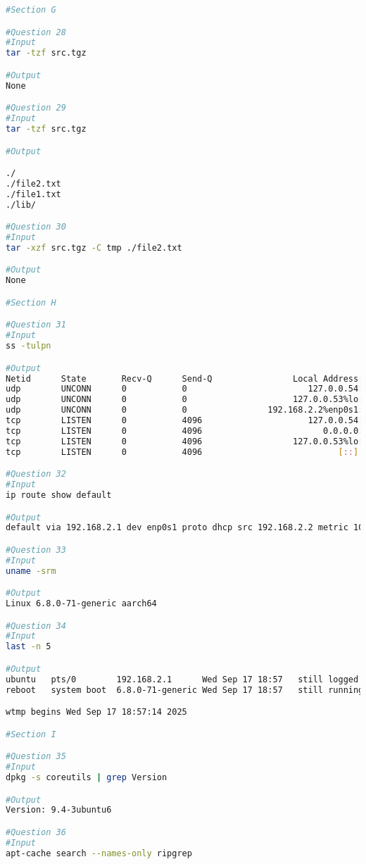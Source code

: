 \begin{lstlisting}[style=linuxstyle, language=bash]
#Section G

#Question 28
#Input
tar -tzf src.tgz

#Output
None

#Question 29
#Input 
tar -tzf src.tgz

#Output

./
./file2.txt
./file1.txt
./lib/

#Question 30
#Input
tar -xzf src.tgz -C tmp ./file2.txt

#Output
None

#Section H

#Question 31
#Input
ss -tulpn

#Output
Netid      State       Recv-Q      Send-Q                Local Address:Port           Peer Address:Port     Process     
udp        UNCONN      0           0                        127.0.0.54:53                  0.0.0.0:*                    
udp        UNCONN      0           0                     127.0.0.53%lo:53                  0.0.0.0:*                    
udp        UNCONN      0           0                192.168.2.2%enp0s1:68                  0.0.0.0:*                    
tcp        LISTEN      0           4096                     127.0.0.54:53                  0.0.0.0:*                    
tcp        LISTEN      0           4096                        0.0.0.0:22                  0.0.0.0:*                    
tcp        LISTEN      0           4096                  127.0.0.53%lo:53                  0.0.0.0:*                    
tcp        LISTEN      0           4096                           [::]:22                     [::]:*        

#Question 32
#Input
ip route show default

#Output
default via 192.168.2.1 dev enp0s1 proto dhcp src 192.168.2.2 metric 100 

#Question 33
#Input
uname -srm

#Output
Linux 6.8.0-71-generic aarch64

#Question 34
#Input
last -n 5

#Output
ubuntu   pts/0        192.168.2.1      Wed Sep 17 18:57   still logged in
reboot   system boot  6.8.0-71-generic Wed Sep 17 18:57   still running

wtmp begins Wed Sep 17 18:57:14 2025

#Section I

#Question 35
#Input
dpkg -s coreutils | grep Version

#Output
Version: 9.4-3ubuntu6

#Question 36
#Input
apt-cache search --names-only ripgrep


\end{lstlisting}
